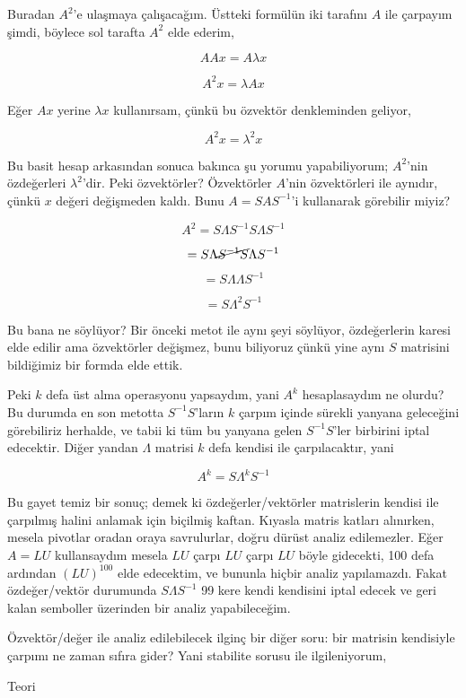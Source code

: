 \documentclass[12pt,fleqn]{article}\usepackage{../../common}
\begin{document}
Buradan $A^2$'e ulaşmaya çalışacağım. Üstteki formülün iki tarafını $A$ ile
çarpayım şimdi, böylece sol tarafta $A^2$ elde ederim,

$$ AAx = A\lambda x $$

$$ A^2x = \lambda A x $$

Eğer $Ax$ yerine $\lambda x$ kullanırsam, çünkü bu özvektör denkleminden geliyor,

$$ A^2x = \lambda^2 x $$

Bu basit hesap arkasından sonuca bakınca şu yorumu yapabiliyorum; $A^2$'nin
özdeğerleri $\lambda^2$'dir. Peki özvektörler? Özvektörler $A$'nin
özvektörleri ile aynıdır, çünkü $x$ değeri değişmeden kaldı. Bunu
$A=SAS^{-1}$'i kullanarak görebilir miyiz?

$$ A^2=S\Lambda S^{-1}S\Lambda S^{-1} $$

$$ =S \Lambda \cancel{S^{-1}S} \Lambda S^{-1} $$

$$ =S \Lambda \Lambda S^{-1} $$

$$ =S \Lambda^2S^{-1} $$

Bu bana ne söylüyor? Bir önceki metot ile aynı şeyi söylüyor, özdeğerlerin
karesi elde edilir ama özvektörler değişmez, bunu biliyoruz çünkü yine aynı $S$
matrisini bildiğimiz bir formda elde ettik.

Peki $k$ defa üst alma operasyonu yapsaydım, yani $A^k$ hesaplasaydım ne
olurdu? Bu durumda en son metotta $S^{-1}S$'ların $k$ çarpım içinde sürekli
yanyana geleceğini görebiliriz herhalde, ve tabii ki tüm bu yanyana gelen
$S^{-1}S$'ler birbirini iptal edecektir. Diğer yandan $\Lambda$ matrisi
$k$ defa kendisi ile çarpılacaktır, yani

$$ A^k = S\Lambda^k S^{-1} $$

Bu gayet temiz bir sonuç; demek ki özdeğerler/vektörler matrislerin kendisi
ile çarpılmış halini anlamak için biçilmiş kaftan. Kıyasla matris katları
alınırken, mesela pivotlar oradan oraya savrulurlar, doğru dürüst analiz
edilemezler. Eğer $A=LU$ kullansaydım mesela $LU$ çarpı $LU$ çarpı $LU$
böyle gidecekti, 100 defa ardından $(LU)^{100}$ elde edecektim, ve bununla
hiçbir analiz yapılamazdı. Fakat özdeğer/vektör durumunda $S\Lambda S^{-1}$
99 kere kendi kendisini iptal edecek ve geri kalan semboller üzerinden bir
analiz yapabileceğim.

Özvektör/değer ile analiz edilebilecek ilginç bir diğer soru: bir matrisin
kendisiyle çarpımı ne zaman sıfıra gider? Yani stabilite sorusu ile
ilgileniyorum, 

Teori
\end{document}
